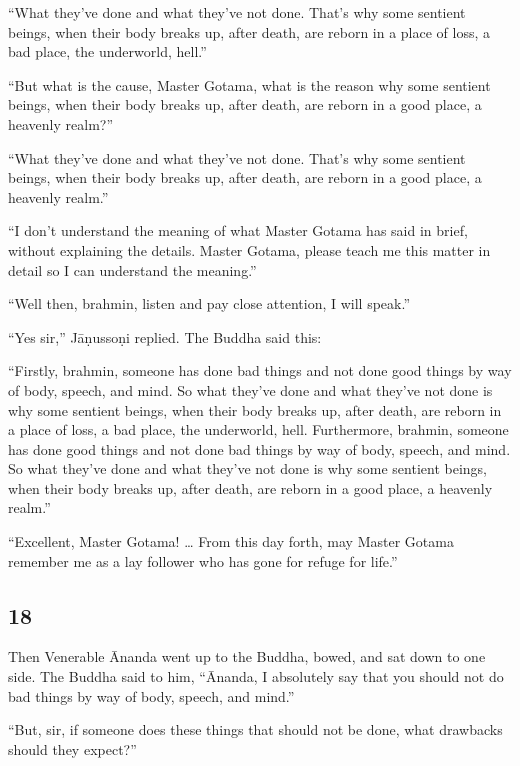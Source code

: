 \documentclass[12pt,openany]{book}%
\begin{document}
“What they’ve done and what they’ve not done. That’s why some sentient beings, when their body breaks up, after death, are reborn in a place of loss, a bad place, the underworld, hell.” 

“But what is the cause, Master Gotama, what is the reason why some sentient beings, when their body breaks up, after death, are reborn in a good place, a heavenly realm?” 

“What they’ve done and what they’ve not done. That’s why some sentient beings, when their body breaks up, after death, are reborn in a good place, a heavenly realm.” 

“I don’t understand the meaning of what Master Gotama has said in brief, without explaining the details. Master Gotama, please teach me this matter in detail so I can understand the meaning.” 

“Well then, brahmin, listen and pay close attention, I will speak.” 

“Yes sir,” \textsanskrit{Jāṇussoṇi} replied. The Buddha said this: 

“Firstly, brahmin, someone has done bad things and not done good things by way of body, speech, and mind. So what they’ve done and what they’ve not done is why some sentient beings, when their body breaks up, after death, are reborn in a place of loss, a bad place, the underworld, hell. Furthermore, brahmin, someone has done good things and not done bad things by way of body, speech, and mind. So what they’ve done and what they’ve not done is why some sentient beings, when their body breaks up, after death, are reborn in a good place, a heavenly realm.” 

“Excellent, Master Gotama! … From this day forth, may Master Gotama remember me as a lay follower who has gone for refuge for life.” 

\subsection*{18 }

Then Venerable Ānanda went up to the Buddha, bowed, and sat down to one side. The Buddha said to him, “Ānanda, I absolutely say that you should not do bad things by way of body, speech, and mind.” 

“But, sir, if someone does these things that should not be done, what drawbacks should they expect?” 
\end{document}
